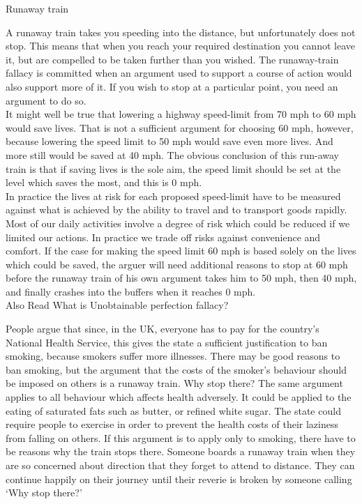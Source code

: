 \documentclass[a4paper,12pt,single,pdftex]{scrartcl}
\begin{document}
  

Runaway train
    
      A runaway train takes you speeding into the distance, but unfortunately does not stop. This means that when you reach your required destination you cannot leave it, but are compelled to be taken further than you wished. The runaway-train fallacy is committed when an argument used to support a course of action would also support more of it. If you wish to stop at a particular point, you need an argument to do so.
    \\

    
      It might well be true that lowering a highway speed-limit from 70 mph to 60 mph would save lives. That is not a sufficient argument for choosing 60 mph, however, because lowering the speed limit to 50 mph would save even more lives. And more still would be saved at 40 mph. The obvious conclusion of this run-away train is that if saving lives is the sole aim, the speed limit should be set at the level which saves the most, and this is 0 mph.
    \\

    
      In practice the lives at risk for each proposed speed-limit have to be measured against what is achieved by the ability to travel and to transport goods rapidly. Most of our daily activities involve a degree of risk which could be reduced if we limited our actions. In practice we trade off risks against convenience and comfort. If the case for making the speed limit 60 mph is based solely on the lives which could be saved, the arguer will need additional reasons to stop at 60 mph before the runaway train of his own argument takes him to 50 mph, then 40 mph, and finally crashes into the buffers when it reaches 0 mph.
    \\

    
      

      
        Also Read  What is Unobtainable perfection fallacy?
      
    
    
      People argue that since, in the UK, everyone has to pay for the country’s National Health Service, this gives the state a sufficient justification to ban smoking, because smokers suffer more illnesses. There may be good reasons to ban smoking, but the argument that the costs of the smoker’s behaviour should be imposed on others is a runaway train. Why stop there? The same argument applies to all behaviour which affects health adversely. It could be applied to the eating of saturated fats such as butter, or refined white sugar. The state could require people to exercise in order to prevent the health costs of their laziness from falling on others. If this argument is to apply only to smoking, there have to be reasons why the train stops there. \newline
Someone boards a runaway train when they are so concerned about direction that they forget to attend to distance. They can continue happily on their journey until their reverie is broken by someone calling ‘Why stop there?’
    \\
\end{document}
